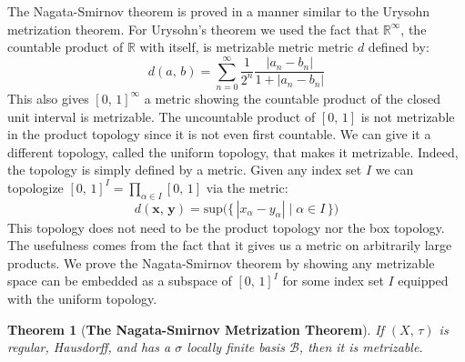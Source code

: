 \documentclass{article}
\theoremstyle{plain}
\newtheorem{theorem}{Theorem}[section]
\theoremstyle{normal}
\begin{document}
        The Nagata-Smirnov theorem is proved in a manner similar to the
        Urysohn metrization theorem. For Urysohn's theorem we used the fact
        that $\mathbb{R}^{\infty}$, the countable product of $\mathbb{R}$ with
        itself, is metrizable metric metric $d$ defined by:
        \begin{equation}
            d(a,\,b)
            =\sum_{n=0}^{\infty}\frac{1}{2^{n}}
                \frac{|a_{n}-b_{n}|}{1+|a_{n}-b_{n}|}
        \end{equation}
        This also gives $[0,\,1]^{\infty}$ a metric showing the countable
        product of the closed unit interval is metrizable. The uncountable
        product of $[0,\,1]$ is not metrizable in the product topology since
        it is not even first countable. We can give it a different topology,
        called the uniform topology, that makes it metrizable. Indeed, the
        topology is simply defined by a metric. Given any index set $I$ we can
        topologize $[0,\,1]^{I}=\prod_{\alpha\in{I}}[0,\,1]$ via the metric:
        \begin{equation}
            d(\mathbf{x},\,\mathbf{y})
            =\textrm{sup}\Big(\big\{\,
                |x_{\alpha}-y_{\alpha}|\;\big|\;\alpha\in{I}\,\big\}\Big)
        \end{equation}
        This topology does not need to be the product topology nor the box
        topology. The usefulness comes from the fact that it gives us a
        metric on arbitrarily large products. We prove the Nagata-Smirnov
        theorem by showing any metrizable space can be embedded as a subspace
        of $[0,\,1]^{I}$ for some index set $I$ equipped with the
        uniform topology.
        \begin{theorem}[\textbf{The Nagata-Smirnov Metrization Theorem}]
            If $(X,\,\tau)$ is regular, Hausdorff, and has a $\sigma$ locally
            finite basis $\mathcal{B}$, then it is metrizable.
        \end{theorem}
\end{document}
